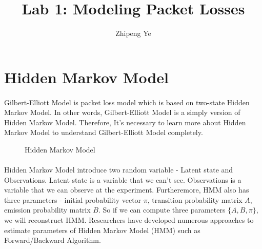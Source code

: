 \documentclass{article}
\title{Lab 1: Modeling Packet Losses}
\author{Zhipeng Ye}
\begin{document}
\maketitle
    \section{Hidden Markov Model}
    \paragraph{}
    Gilbert-Elliott Model is packet loss model which is based on two-state Hidden Markov Model.
    In other words, Gilbert-Elliott Model is a simply version of Hidden Markov Model. 
    Therefore, It's necessary to learn more about Hidden Markov Model to understand Gilbert-Elliott Model completely.
    \begin{figure}[ht]
        \centering
        \caption{Hidden Markov Model}
        \label{fig:ch5:jointentropy}
    \end{figure}
    \paragraph{}
    Hidden Markov Model introduce two random variable - Latent state and Observations. Latent state is a variable that we can't see.
    Observations is a variable that we can observe at the experiment.
    Furtheremore, HMM also has three parameters - initial probability vector $\pi$, transition probability matrix $A$,
    emission probability matrix $B$. So if we can compute three parameters $\{A,B,\pi\}$, we will reconstruct HMM.
    Researchers have developed numerous approaches to estimate parameters of Hidden Markov Model (HMM) such as Forward/Backward Algorithm.
\end{document}
